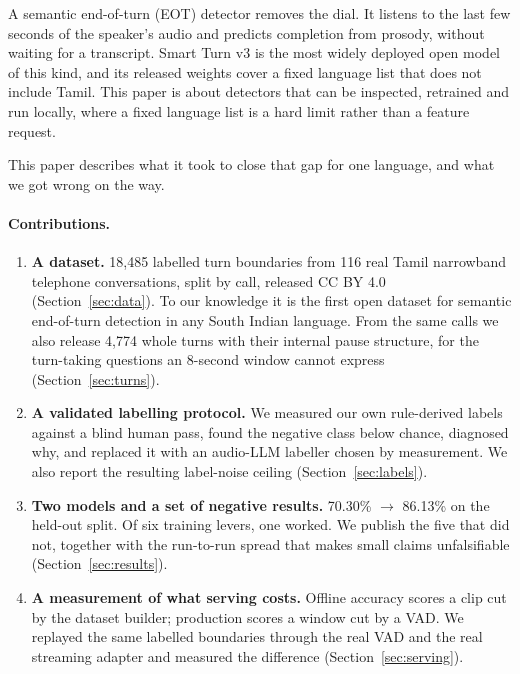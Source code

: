 \documentclass[11pt]{article}
\newcommand{\pct}{\%}
\begin{document}
A semantic end-of-turn (EOT) detector removes the dial. It listens to the last
few seconds of the speaker's audio and predicts completion from prosody, without
waiting for a transcript. Smart Turn v3 \cite{smartturn} is the most widely
deployed open model of this kind, and its released weights cover a fixed
language list that does not include Tamil. This paper is about detectors that
can be inspected, retrained and run locally, where a fixed language list is a
hard limit rather than a feature request.

This paper describes what it took to close that gap for one language, and what
we got wrong on the way.

\paragraph{Contributions.}
\begin{enumerate}\itemsep2pt
\item \textbf{A dataset.} 18,485 labelled turn boundaries from 116 real Tamil
narrowband telephone conversations, split by call, released CC BY 4.0
(Section~\ref{sec:data}). To our knowledge it is the first open dataset for
semantic end-of-turn detection in any South Indian language. From the same
calls we also release 4,774 whole turns with their
internal pause structure, for the turn-taking questions an 8-second window
cannot express (Section~\ref{sec:turns}).

\item \textbf{A validated labelling protocol.}
We measured our own rule-derived labels against a blind human pass, found the
negative class below chance, diagnosed why, and replaced it with an audio-LLM
labeller chosen by measurement. We also report the resulting label-noise
ceiling (Section~\ref{sec:labels}).

\item \textbf{Two models and a set of negative results.} 70.30\pct{}
$\rightarrow$ 86.13\pct{} on the held-out split. Of six training levers, one
worked. We publish the five that did not, together with the run-to-run spread
that makes small claims unfalsifiable (Section~\ref{sec:results}).

\item \textbf{A measurement of what serving costs.} Offline accuracy scores a
clip cut by the dataset builder; production scores a window cut by a VAD. We
replayed the same labelled boundaries through the real VAD and the real
streaming adapter and measured the difference (Section~\ref{sec:serving}).
\end{enumerate}
\end{document}
